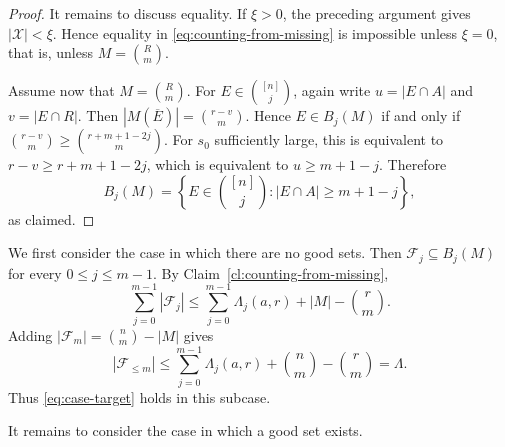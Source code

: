 \documentclass[10pt,a4paper]{article}
\numberwithin{equation}{section}
\theoremstyle{definition}
\newcommand{\F}{\mathcal F}
\begin{document}
\begin{proof}
    It remains to discuss equality.
    If \(\xi>0\), the preceding argument gives \(|\mathcal X|<\xi\).
    Hence equality in \eqref{eq:counting-from-missing} is impossible unless \(\xi=0\), that is, unless \(M=\binom Rm\).

    Assume now that \(M=\binom Rm\).
    For \(E\in\binom{[n]}j\), again write \(u=|E\cap A|\) and \(v=|E\cap R|\).
    Then \(|M(\overline E)|=\binom{r-v}{m}\).
    Hence \(E\in B_j(M)\) if and only if \(\binom{r-v}{m}\ge\binom{r+m+1-2j}{m}\).
    For \(s_0\) sufficiently large, this is equivalent to \(r-v\ge r+m+1-2j\), which is equivalent to \(u\ge m+1-j\).
    Therefore
    \[
        B_j(M)=
        \left\{
        E\in\binom{[n]}j: |E\cap A|\ge m+1-j
        \right\},
    \]
    as claimed.
\end{proof}

We first consider the case in which there are no good sets.
Then \(\F_j\subseteq B_j(M)\) for every \(0\le j\le m-1\).  By
Claim~\ref{cl:counting-from-missing},
\[
    \sum_{j=0}^{m-1}|\F_j|
    \le
    \sum_{j=0}^{m-1}\Lambda_j(a,r)+|M|-\binom rm.
\]
Adding $|\F_m|=\binom nm-|M|$ gives
\[
    |\F_{\le m}|
    \le
    \sum_{j=0}^{m-1}\Lambda_j(a,r)+\binom nm-\binom rm
    =
    \Lambda.
\]
Thus \eqref{eq:case-target} holds in this subcase.


It remains to consider the case in which a good set exists.
\end{document}
